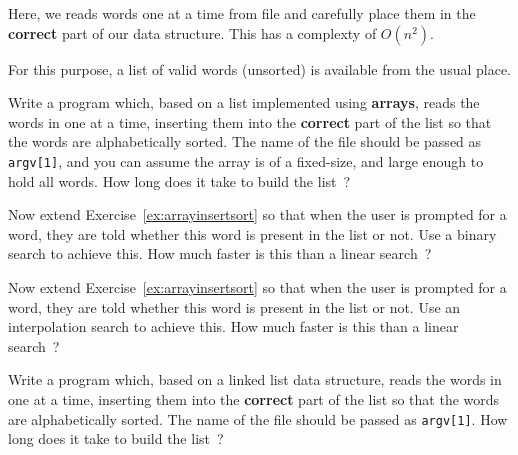 
Here, we reads words one at a time
from file and carefully place them in the {\bf correct} part of
our data structure. This has a complexty of $O(n^2)$.

For this purpose, a list of valid words (unsorted) is available
from the usual place.

\begin{exercise}
\label{ex:arrayinsertsort}
Write a program which, based on a
list implemented using {\bf arrays}, reads the words in
one at a time, inserting them into the {\bf correct} part of the list
so that the words are alphabetically sorted.
The name of the file should be passed as \verb^argv[1]^,
and you can assume the array is of a fixed-size,
and large enough to hold all words.
How long does it take to build the list~?
\end{exercise}

\begin{exercise}
Now extend Exercise~\ref{ex:arrayinsertsort}
so that when the user is prompted for a word,
they are told whether this word is present in the list or not.
Use a binary search to achieve this.
How much faster is this than a linear search~?
\end{exercise}

\begin{exercise}
Now extend Exercise~\ref{ex:arrayinsertsort}
so that when the user is prompted for a word,
they are told whether this word is present in the list or not.
Use an interpolation search to achieve this.
How much faster is this than a linear search~?
\end{exercise}

\begin{exercise}
Write a program which, based on a
linked list data structure, reads the words in
one at a time, inserting them into the {\bf correct} part of the list
so that the words are alphabetically sorted.
The name of the file should be passed as \verb^argv[1]^.
How long does it take to build the list~?
\end{exercise}

